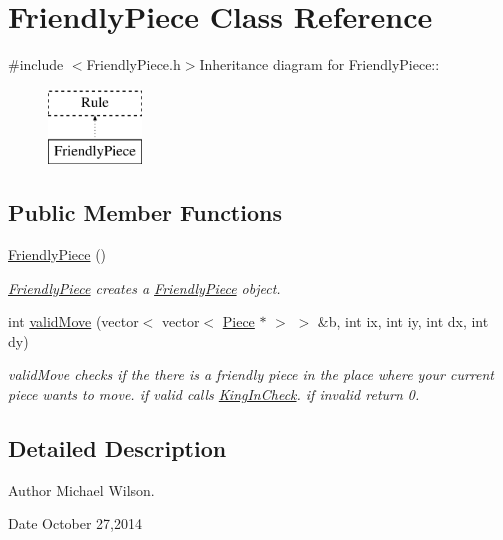 \hypertarget{classFriendlyPiece}{
\section{FriendlyPiece Class Reference}
\label{classFriendlyPiece}
}


{\ttfamily \#include $<$FriendlyPiece.h$>$}Inheritance diagram for FriendlyPiece::\begin{figure}[H]
\begin{center}
\leavevmode
\includegraphics[height=2cm]{classFriendlyPiece}
\end{center}
\end{figure}
\subsection*{Public Member Functions}
\begin{DoxyCompactItemize}
\item 
\hyperlink{classFriendlyPiece_ac366bba74bf5c47475beb9da05875407}{FriendlyPiece} ()
\begin{DoxyCompactList}\small\item\em \hyperlink{classFriendlyPiece}{FriendlyPiece} creates a \hyperlink{classFriendlyPiece}{FriendlyPiece} object. \item\end{DoxyCompactList}\item 
int \hyperlink{classFriendlyPiece_aafce56ffcfb8c78a41529d482a89737d}{validMove} (vector$<$ vector$<$ \hyperlink{classPiece}{Piece} $\ast$ $>$ $>$ \&b, int ix, int iy, int dx, int dy)
\begin{DoxyCompactList}\small\item\em validMove checks if the there is a friendly piece in the place where your current piece wants to move. if valid calls \hyperlink{classKingInCheck}{KingInCheck}. if invalid return 0. \item\end{DoxyCompactList}\end{DoxyCompactItemize}


\subsection{Detailed Description}
\begin{DoxyAuthor}{Author}
Michael Wilson. 
\end{DoxyAuthor}
\begin{DoxyDate}{Date}
October 27,2014 
\end{DoxyDate}


